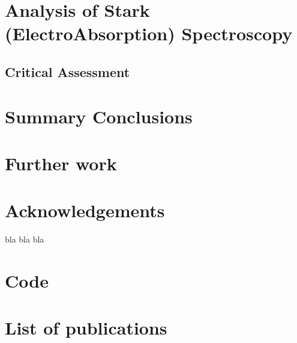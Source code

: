 \documentclass[a4paper, 12pt, openright]{book}
\begin{document}
\chapter{Analysis of Stark (ElectroAbsorption) Spectroscopy}
	
	\section{Critical Assessment}	

\chapter{Summary Conclusions}


\chapter{Further work}


\chapter*{Acknowledgements}
bla bla bla

\appendix
\chapter{Code}


\chapter{List of publications}
\end{document}
